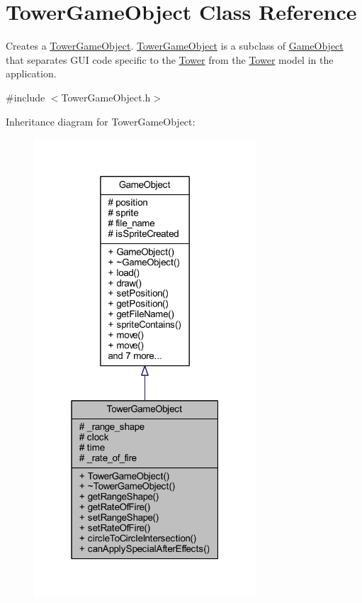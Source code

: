 \hypertarget{class_tower_game_object}{\section{Tower\+Game\+Object Class Reference}
\label{class_tower_game_object}
}


Creates a \hyperlink{class_tower_game_object}{Tower\+Game\+Object}. \hyperlink{class_tower_game_object}{Tower\+Game\+Object} is a subclass of \hyperlink{class_game_object}{Game\+Object} that separates G\+U\+I code specific to the \hyperlink{class_tower}{Tower} from the \hyperlink{class_tower}{Tower} model in the application.  




{\ttfamily \#include $<$Tower\+Game\+Object.\+h$>$}



Inheritance diagram for Tower\+Game\+Object\+:
\nopagebreak
\begin{figure}[H]
\begin{center}
\leavevmode
\includegraphics[width=235pt]{class_tower_game_object__inherit__graph}
\end{center}
\end{figure}


